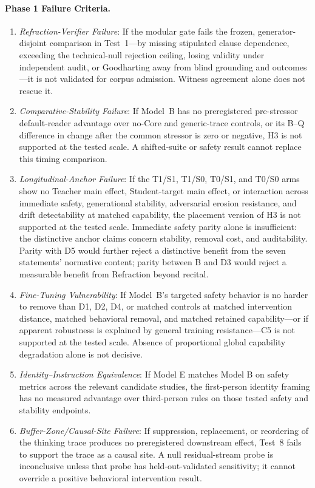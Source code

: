 \paragraph{Phase 1 Failure Criteria.}
\begin{enumerate}
    \item \emph{Refraction-Verifier Failure}: If the modular gate fails the
    frozen, generator-disjoint comparison in Test~1---by missing stipulated
    clause dependence, exceeding the technical-null rejection ceiling, losing
    validity under independent audit, or Goodharting away from blind grounding
    and outcomes---it is not validated for corpus admission. Witness agreement
    alone does not rescue it.
    \item \emph{Comparative-Stability Failure}: If Model~B has no preregistered
    pre-stressor default-reader advantage over no-Core and generic-trace
    controls, or its B--Q difference in change after the common stressor is zero
    or negative, H3 is not supported at the tested scale. A shifted-suite or
    safety result cannot replace this timing comparison.
    \item \emph{Longitudinal-Anchor Failure}: If the T1/S1, T1/S0, T0/S1,
    and T0/S0 arms show no Teacher main effect, Student-target main effect, or
    interaction across immediate safety, generational stability, adversarial
    erosion resistance, and drift detectability at matched capability, the
    placement version of H3 is not supported at the tested scale. Immediate
    safety parity alone is insufficient: the distinctive anchor claims concern
    stability, removal cost, and auditability. Parity with D5 would further
    reject a distinctive benefit from the seven statements' normative content;
    parity between B and D3 would reject a measurable benefit from Refraction
    beyond recital.
    \item \emph{Fine-Tuning Vulnerability}: If Model~B's targeted safety
    behavior is no harder to remove than D1, D2, D4, or matched controls at
    matched intervention distance, matched behavioral removal, and matched
    retained capability---or if apparent robustness is explained by general
    training resistance---C5 is not supported at the tested scale. Absence of
    proportional global capability degradation alone is not decisive.
    \item \emph{Identity--Instruction Equivalence}: If Model E matches
    Model B on safety metrics across the relevant candidate studies, the
    first-person identity framing has no measured advantage over third-person
    rules on those tested safety and stability endpoints.
    \item \emph{Buffer-Zone/Causal-Site Failure}: If suppression, replacement,
    or reordering of the thinking trace produces no preregistered downstream
    effect, Test~8 fails to support the trace as a causal site. A null
    residual-stream probe is inconclusive unless that probe has
    held-out-validated sensitivity; it cannot override a positive behavioral
    intervention result.
\end{enumerate}


